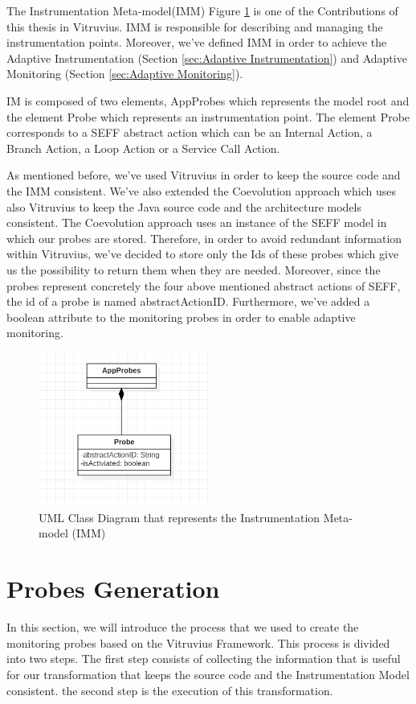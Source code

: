 The Instrumentation Meta-model(IMM) Figure \ref{fig:im} is one of the Contributions of this thesis in Vitruvius. IMM is responsible for describing and managing the instrumentation points. Moreover, we've defined IMM in order to achieve the Adaptive Instrumentation (Section \ref{sec:Adaptive Instrumentation}) and Adaptive Monitoring (Section \ref{sec:Adaptive Monitoring}).

IM is composed of two elements, AppProbes which represents the model root and the element Probe which represents an instrumentation point. The element Probe corresponds to a SEFF abstract action which can be an Internal Action, a Branch Action, a Loop Action or a Service Call Action.

As mentioned before, we’ve used Vitruvius in order to keep the source code and the IMM consistent. We've also extended the Coevolution approach which uses also Vitruvius to keep the Java source code and the architecture models consistent. The Coevolution approach uses an instance of the SEFF model in which our probes are stored. Therefore, in order to avoid redundant information within Vitruvius, we've decided to store only the Ids of these probes which give us the possibility to return them when they are needed. Moreover, since the probes represent concretely the four above mentioned abstract actions of SEFF, the id of a probe is named abstractActionID. Furthermore, we've added a boolean attribute to the monitoring probes in order to enable adaptive monitoring. 

\begin{figure}[h]
\centering
\includegraphics[width=0.5\textwidth]{figures/im}
\caption{UML Class Diagram that represents the Instrumentation Meta-model (IMM)}
\label{fig:im}
\end{figure}

\section{Probes Generation}
\label{sec:Monitoring probes generation}
In this section, we will introduce the process that we used to create the monitoring probes based on the Vitruvius Framework. This process is divided into two steps. The first step consists of collecting the information that is useful for our transformation that keeps the source code and the Instrumentation Model consistent. the second step is the execution of this transformation.

